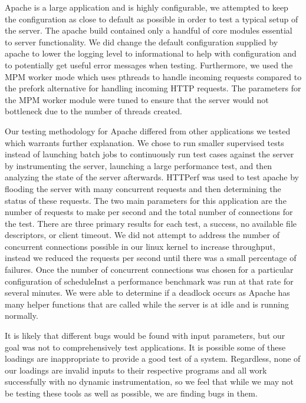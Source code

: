 \documentclass[10pt,]{article} %
\begin{document}
Apache is a large application and is highly configurable, we attempted to keep the configuration as close to default as possible in order to test a typical setup of the server. The apache build contained only a handful of core modules essential to server functionality. We did change the default configuration supplied by apache to lower the logging level to informational to help with configuration and to potentially get useful error messages when testing. Furthermore, we used the MPM worker mode which uses pthreads to handle incoming requests compared to the prefork alternative for handling incoming HTTP requests. The parameters for the MPM worker module were tuned to ensure that the server would not bottleneck due to the number of threads created.

Our testing methodology for Apache differed from other applications we tested which warrants further explanation. We chose to run smaller supervised tests instead of launching batch jobs to continuously run test cases against the server by instrumenting the server, launching a large performance test, and then analyzing the state of the server afterwards. HTTPerf was used to test apache by flooding the server with many concurrent requests and then determining the status of these requests. The two main parameters for this application are the number of requests to make per second and the total number of connections for the test. There are three primary results for each test, a success, no available file descriptors, or client timeout. We did not attempt to address the number of concurrent connections possible in our linux kernel to increase throughput, instead we reduced the requests per second until there was a small percentage of failures. Once the number of concurrent connections was chosen for a particular configuration of scheduleInst a performance benchmark was run at that rate for several minutes. We were able to determine if a deadlock occurs as Apache has many helper functions that are called while the server is at idle and is running normally. 

It is likely that different bugs would be found with input parameters, but our goal was not to comprehensively test applications. It is possible some of these loadings are inappropriate to provide a good test of a system.  Regardless, none of our loadings are invalid inputs to their respective programs and all work successfully with no dynamic instrumentation, so we feel that while we may not be testing these tools as well as possible, we are finding bugs in them.  
\end{document}
